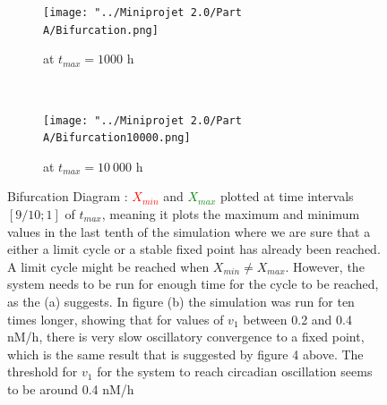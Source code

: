 \documentclass[10pt,a4paper,oneside,twocolumn]{article}
\newcommand{\red}[1]{\textcolor{red}{#1}}
\newcommand{\green}[1]{\textcolor{green}{#1}}
\numberwithin{equation}{section} %
\begin{document}
    \begin{figure}
	\centering
	    \begin{subfigure}[b]{0.35\textwidth}
		\texttt{[image: "../Miniprojet 2.0/Part A/Bifurcation.png]}
		\caption{at $t_{max}=1000$ h}
	    \end{subfigure}
	     ~ 
	    \begin{subfigure}[b]{0.35\textwidth}
		\texttt{[image: "../Miniprojet 2.0/Part A/Bifurcation10000.png]}
		\caption{at $t_{max}=10~000$ h}
	    \end{subfigure}
	    \caption{\small{Bifurcation Diagram : \red{$X_{min}$} and \green{$X_{max}$} plotted at time intervals $[9/10; 1]$ of $t_{max}$, meaning it plots the maximum and minimum values in the last tenth of the simulation where we are sure that a either a limit cycle or a stable fixed point has already been reached. A limit cycle might be reached when $X_{min} \neq X_{max}$. However, the system needs to be run for enough time for the cycle to be reached, as the (a) suggests. In figure (b) the simulation was run for ten times longer, showing that for values of $v_1$ between 0.2 and 0.4 nM/h, there is very slow oscillatory convergence to a fixed point, which is the same result that is suggested by figure 4 above. The threshold for $v_1$ for the system to reach circadian oscillation seems to be around 0.4 nM/h}}
    \end{figure}
\end{document}
